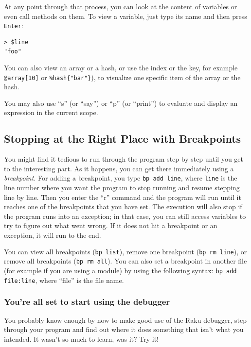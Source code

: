 At any point through that process, you can look at the 
content of variables or even call methods on them. To 
view a variable, just type its name and then press 
{\tt Enter}:

\begin{verbatim}
> $line
"foo"
\end{verbatim}

You can also view an array or a hash, or use the index 
or the key, for example \verb'@array[10]' or 
\verb'%hash{"bar"}'), to visualize one specific item of 
the array or the hash.

You may also use ``s'' (or ``say'') or ``p'' (or ``print'') 
to evaluate and display an expression in the current scope.

\subsection{Stopping at the Right Place with Breakpoints}

You might find it tedious to run through the program step 
by step until you get to the interesting part. As it happens, 
you can get there immediately using a \emph{breakpoint}. For 
adding a breakpoint, you type {\tt bp add line}, where 
{\tt line} is the line number where you want the program to stop running 
and resume stepping line by line. Then you enter the ``r'' 
command and the program will run until it reaches one of the 
breakpoints that you have set. The execution will also 
stop if the program runs into an exception; in that case, 
you can still access variables to try to figure out what went 
wrong. If it does not hit a breakpoint or an exception, it 
will run to the end.

You can view all breakpoints ({\tt bp list}), remove 
one breakpoint ({\tt bp rm line}), or remove all breakpoints 
({\tt bp rm all}). You can also set a breakpoint in 
another file (for example if you are using a module) by 
using the following syntax: {\tt bp add file:line}, where 
``file'' is the file name.

\subsubsection{You're all set to start using the debugger}

You probably know enough by now to make good use of the Raku 
debugger, step through your program and find out where it 
does something that isn't what you intended. It wasn't so 
much to learn, was it? Try it!

